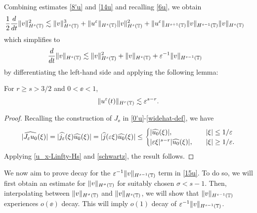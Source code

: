 %
%
Combining estimates \eqref{8'u} and \eqref{14u} and recalling
\eqref{6u}, we obtain
%
%
\begin{equation*}
\begin{split}
\frac{1}{2}\frac{d}{dt}\|v\|_{H^{s}(\mathbb{T})}^2
& \lesssim \|v\|_{H^s(\mathbb{T})}^3 + \|u^\varepsilon\|_{H^s(\mathbb{T})}
\|v\|_{H^s(\mathbb{T})}^2
 + \|u^\varepsilon\|_{H^{s+1}(\mathbb{T})}
\|v\|_{H^{s-1}(\mathbb{T})} \|v\|_{H^s(\mathbb{T})}
\end{split}
\end{equation*}
%
%
which simplifies to 
\begin{equation}
\begin{split}
\frac{d}{dt}\|v\|_{H^{s}(\mathbb{T})}
& \lesssim \|v\|_{H^s(\mathbb{T})}^2 + 
\|v\|_{H^s(\mathbb{T})}
+ \varepsilon^{-1}
\|v\|_{H^{s-1}(\mathbb{T})} 
\label{15u}
\end{split}
\end{equation}
by differentiating the left-hand side and applying the following lemma:
%
%
%
\begin{lemma}
\label{lem5r}
For $r \ge s > 3/2$ and $0 < \ee <1$, 
%
%
\begin{equation}
\begin{split}
\|u^{\varepsilon} (t) \|_{H^r(\mathbb{T})} \lesssim \varepsilon^{s-r}.
\label{700r}
\end{split}
\end{equation}
%
%
\end{lemma}
%
%
\begin{proof} Recalling the construction of $J_\ee$ in 
\eqref{0'u}-\eqref{widehat-def},  we have
%
%
\begin{equation}
   \label{schwartz}
	|\widehat{J_\varepsilon u_0}(\xi)| = |\widehat{j_\varepsilon}(\xi) \widehat{u_0}(\xi)|
	= |\widehat{j }(\varepsilon \xi) \widehat{u_0}(\xi)| 
\le 
  \begin{cases}
    | \widehat{u_{0}}(\xi) |, \quad & | \xi | \le 1/\varepsilon
\\
| \varepsilon \xi |^{s-r} | \widehat{u_{0}}(\xi) |, \quad  & | \xi | \ge 1/\varepsilon.
\end{cases}
\end{equation}
%
%
%
%
%
Applying \eqref{u_x-Linfty-Hs} and \eqref{schwartz}, the result follows.
\end{proof}
%
%
%
We now aim to prove decay for the $\varepsilon^{-1}
\|v\|_{H^{s-1}(\mathbb{T})} $ term in \eqref{15u}. To do so, we 
will first obtain an estimate for
$\|v\|_{H^\sigma(\mathbb{T})}$ for suitably chosen $\sigma < s-1$. Then, 
interpolating between $\|v\|_{H^\sigma(\mathbb{T})}$
and $\|v\|_{H^s(\mathbb{T})}$, we will show that 
$\|v\|_{H^{s-1}(\mathbb{T})}$ experiences $o(\ee)$ decay. This will imply
$o(1)$ decay of $\varepsilon^{-1}
\|v\|_{H^{s-1}(\mathbb{T})} $.
